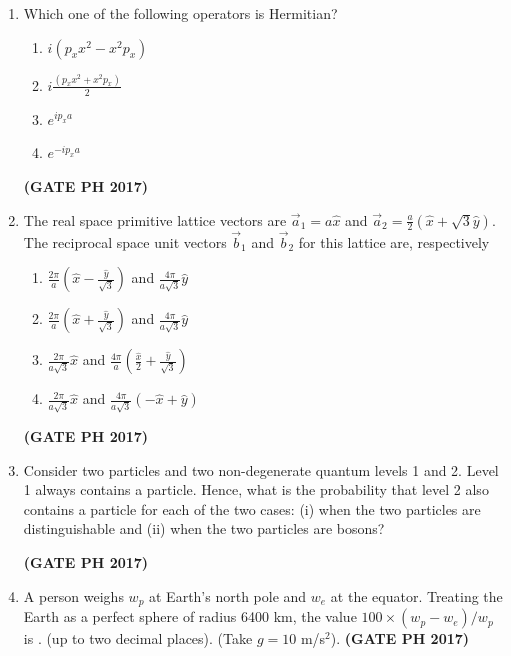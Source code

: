 \documentclass[14pt, a4paper]{extarticle}
\renewcommand{\vec}[1]{\overrightarrow{#1}}
\begin{document}
\begin{enumerate}[label=\textbf{Q.\arabic*}]
\item Which one of the following operators is Hermitian?
\begin{enumerate}
\item $i(p_x x^2 - x^2 p_x)$
\item $i\frac{(p_x x^2 + x^2 p_x)}{2}$
\item $e^{i p_x a}$
\item $e^{-i p_x a}$
\end{enumerate}
\hfill \textbf{(GATE PH 2017)}

\item The real space primitive lattice vectors are $\vec{a}_1 = a\hat{x}$ and $\vec{a}_2 = \frac{a}{2}(\hat{x}+\sqrt{3}\hat{y})$. The reciprocal space unit vectors $\vec{b}_1$ and $\vec{b}_2$ for this lattice are, respectively
\begin{enumerate}
\item $\frac{2\pi}{a}\left(\hat{x}-\frac{\hat{y}}{\sqrt{3}}\right)$ and $\frac{4\pi}{a\sqrt{3}}\hat{y}$
\item $\frac{2\pi}{a}\left(\hat{x}+\frac{\hat{y}}{\sqrt{3}}\right)$ and $\frac{4\pi}{a\sqrt{3}}\hat{y}$
\item $\frac{2\pi}{a\sqrt{3}}\hat{x}$ and $\frac{4\pi}{a}\left(\frac{\hat{x}}{2}+\frac{\hat{y}}{\sqrt{3}}\right)$
\item $\frac{2\pi}{a\sqrt{3}}\hat{x}$ and $\frac{4\pi}{a\sqrt{3}}\left(-\hat{x}+\hat{y}\right)$
\end{enumerate}
\hfill \textbf{(GATE PH 2017)}

\item Consider two particles and two non-degenerate quantum levels 1 and 2. Level 1 always contains a particle. Hence, what is the probability that level 2 also contains a particle for each of the two cases: (i) when the two particles are distinguishable and (ii) when the two particles are bosons?
\begin{enumerate}
\end{enumerate}
\hfill \textbf{(GATE PH 2017)}

\item A person weighs $w_p$ at Earth's north pole and $w_e$ at the equator. Treating the Earth as a perfect sphere of radius 6400 km, the value $100 \times (w_p - w_e)/w_p$ is \underline{\hspace{3cm}}. (up to two decimal places). (Take $g = 10$ m/s$^2$).
\hfill \textbf{(GATE PH 2017)}


\end{enumerate}
\end{document}
